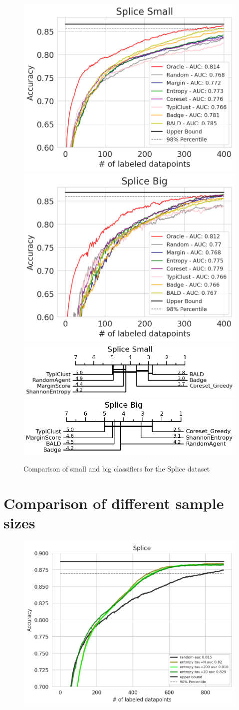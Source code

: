 \documentclass[]{article}
\begin{document}
\begin{figure}
	\centering
	\includegraphics[width=0.49\linewidth]{img/supp_splice_small.png}
	\includegraphics[width=0.49\linewidth]{img/supp_splice_big.png}
	\includegraphics[width=0.49\linewidth]{img/supp_micro_splice_small.png}
	\includegraphics[width=0.49\linewidth]{img/supp_micro_splice_big.png}
	\caption{Comparison of small and big classifiers for the Splice dataset}
\end{figure}


\section{Comparison of different sample sizes}
\begin{figure}[H]
\centering
\includegraphics[width=0.7\linewidth]{img/tau_ablation.png}
\end{figure}
\end{document}
